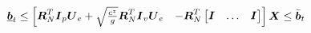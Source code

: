 \begin{align*}
    \underbar{\V{b}}_t  
    \le 
        \begin{bmatrix}
            \M{R}_N^T \M{I}_p \M{U}_e  +  \sqrt{\frac{c^z}{g}} \M{R}_N^T \M{I}_v \M{U}_e &
            -  \M{R}_N^T  \begin{bmatrix} \M{I} & \dots & \M{I} \end{bmatrix}
        \end{bmatrix} 
        \V{X} 
    \le
    \bar{\V{b}}_t
\end{align*}
